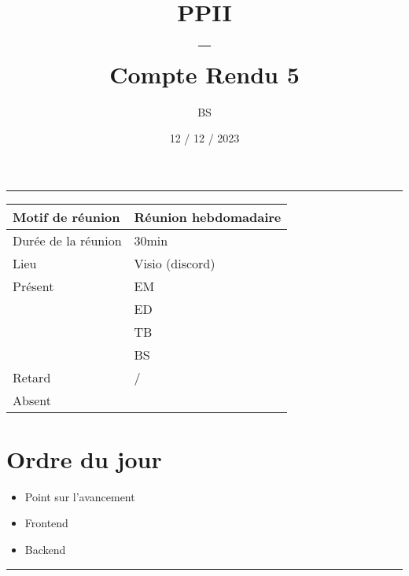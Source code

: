 \documentclass[10pt,a4paper]{report}
\title{PPII \\ -- \\ Compte Rendu 5}
\date{12 / 12 / 2023}
\author{BS}
\begin{document}
\maketitle

\tableofcontents \bigskip

\noindent\rule{\linewidth}{0.5mm} \bigskip

                \begin{tabular}{|l | l|}
                        \hline
                Motif de réunion & Réunion hebdomadaire \\
                        \hline
                Durée de la réunion & 30min \\
                        \hline
                Lieu & Visio (discord) \\
                        \hline
                Présent & EM \\
                        & ED \\
                        & TB  \\
                        & BS  \\
                        \hline
                Retard  & / \\
                        \hline
                Absent  &  \\
                        \hline
                \end{tabular}


\section{Ordre du jour}
\begin{itemize}
        \item Point sur l’avancement
        \item Frontend
        \item Backend
\end{itemize}

\noindent\rule{\linewidth}{0.5mm} \bigskip
\end{document}
